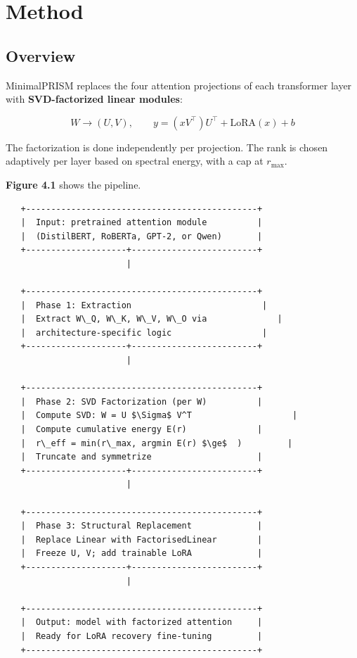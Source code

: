 
\section{Method}

\subsection{Overview}

MinimalPRISM replaces the four attention projections of each transformer 
layer with \textbf{SVD-factorized linear modules}:

\[
W \to (U, V), \qquad
y = (x V^\top) U^\top + \text{LoRA}(x) + b
\tag{4.1}
\]

The factorization is done independently per projection. The rank is chosen 
adaptively per layer based on spectral energy, with a cap at $r_\text{max}$.

\textbf{Figure 4.1} shows the pipeline.

\begin{lstlisting}
   +----------------------------------------------+
   |  Input: pretrained attention module          |
   |  (DistilBERT, RoBERTa, GPT-2, or Qwen)       |
   +--------------------+-------------------------+
                        |
                         
   +----------------------------------------------+
   |  Phase 1: Extraction                          |
   |  Extract W\_Q, W\_K, W\_V, W\_O via              |
   |  architecture-specific logic                  |
   +--------------------+-------------------------+
                        |
                         
   +----------------------------------------------+
   |  Phase 2: SVD Factorization (per W)          |
   |  Compute SVD: W = U $\Sigma$ V^T                    |
   |  Compute cumulative energy E(r)              |
   |  r\_eff = min(r\_max, argmin E(r) $\ge$  )         |
   |  Truncate and symmetrize                     |
   +--------------------+-------------------------+
                        |
                         
   +----------------------------------------------+
   |  Phase 3: Structural Replacement             |
   |  Replace Linear with FactorisedLinear        |
   |  Freeze U, V; add trainable LoRA             |
   +--------------------+-------------------------+
                        |
                         
   +----------------------------------------------+
   |  Output: model with factorized attention     |
   |  Ready for LoRA recovery fine-tuning         |
   +----------------------------------------------+
\end{lstlisting}

